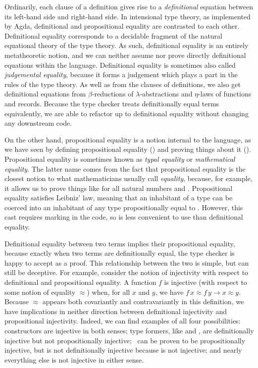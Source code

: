 Ordinarily, each clause of a definition gives rise to a \emph{definitional}
equation between its left-hand side and right-hand side.
In intensional type theory, as implemented by Agda, definitional and
propositional equality are contrasted to each other.
Definitional equality corresponds to a decidable fragment of the natural
equational theory of the type theory.
As such, definitional equality is an entirely metatheoretic notion, and we can
neither assume nor prove directly definitional equations within the language.
Definitional equality is sometimes also called \emph{judgemental equality},
because it forms a judgement which plays a part in the rules of the type theory.
As well as from the clauses of definitions, we also get definitional equations
from $\beta$-reductions of $\lambda$-abstractions and $\eta$-laws of functions
and records.
Because the type checker treats definitionally equal terms equivalently, we are
able to refactor up to definitional equality without changing any downstream
code.

On the other hand, propositional equality is a notion internal to the language,
as we have seen by defining propositional equality (\AgdaDatatype{\_$\equiv$\_})
and proving things about it ().
Propositional equality is sometimes known as \emph{typal equality} or
\emph{mathematical equality}.
The latter name comes from the fact that propositional equality is the closest
notion to what mathematicians usually call \emph{equality}, because, for
example, it allows us to prove things like
\AgdaSpace{}\AgdaFunction{+}\AgdaSpace{}%
\AgdaSpace{}\AgdaDatatype{$\equiv$}\AgdaSpace{}%
\AgdaSpace{}\AgdaFunction{+}\AgdaSpace{} for all
natural numbers  and .
Propositional equality satisfies Leibniz' law, meaning that an inhabitant of a
type  can be coerced into an inhabitant of any type propositionally
equal to .
However, this cast requires marking in the code, so is less convenient to use
than definitional equality.

Definitional equality between two terms implies their propositional equality,
because exactly when two terms are definitionally equal, the type checker is
happy to accept  as a proof.
This relationship between the two is simple, but can still be deceptive.
For example, consider the notion of injectivity with respect to definitional
and propositional equality.
A function $f$ is injective (with respect to some notion of equality $\approx$)
when, for all $x$ and $y$, we have $f\,x \approx f\,y \to x \approx y$.
Because $\approx$ appears both covariantly and contravariantly in this
definition, we have implications in neither direction between definitional
injectivity and propositional injectivity.
Indeed, we can find examples of all four possibilities:
constructors are injective in both senses; type formers, like 
and , are definitionally injective but not propositionally
injective;
\ can be proven to be
propositionally injective, but is not definitionally injective because
\AgdaFunction{\_+\_} is not injective;
and nearly everything else is not injective in either sense.

